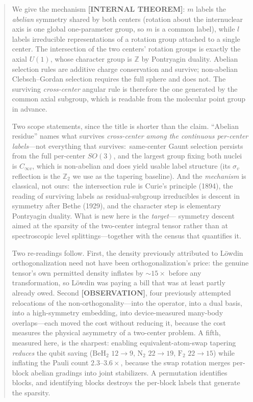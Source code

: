 \documentclass[aps,pra,twocolumn,superscriptaddress,longbibliography]{revtex4-2}
\begin{document}
\begin{abstract}
We give the mechanism \textbf{[INTERNAL THEOREM]}: $m$ labels the
\emph{abelian} symmetry shared by both centers (rotation about the
internuclear axis is one global one-parameter group, so $m$ is a common
label), while $l$ labels irreducible representations of a rotation group
attached to a single center.  The intersection of the two centers'
rotation groups is exactly the axial $U(1)$, whose character group is
$\mathbb{Z}$ by Pontryagin duality.  Abelian selection rules are additive
charge conservation and survive; non-abelian Clebsch--Gordan selection
requires the full sphere and does not.  The surviving \emph{cross-center}
angular rule is therefore the one generated by the common axial subgroup,
which is readable from the molecular point group in advance.

Two scope statements, since the title is shorter than the claim.
``Abelian residue'' names what survives \emph{cross-center among the
continuous per-center labels}---not everything that survives:\ same-center
Gaunt selection persists from the full per-center $SO(3)$, and the largest
group fixing both nuclei is $C_{\infty v}$, which is non-abelian and does
yield usable label structure (its $\sigma_v$ reflection is the
$\mathbb{Z}_2$ we use as the tapering baseline).  And the \emph{mechanism}
is classical, not ours:\ the intersection rule is Curie's principle (1894),
the reading of surviving labels as residual-subgroup irreducibles is
descent in symmetry after Bethe (1929), and the character step is
elementary Pontryagin duality.  What is new here is the \emph{target}---
symmetry descent aimed at the sparsity of the two-center integral tensor
rather than at spectroscopic level splittings---together with the census
that quantifies it.

Two re-readings follow.  First, the density previously attributed to
L\"owdin orthogonalization need not have been orthogonalization's price: the
genuine tensor's own permitted density inflates by $\sim 15\times$ before any
transformation, so L\"owdin was paying a bill that was at least partly already owed.  Second \textbf{[OBSERVATION]}, four previously attempted
relocations of the non-orthogonality---into the operator, into a dual
basis, into a high-symmetry embedding, into device-measured many-body
overlaps---each moved the cost without reducing it, because the cost
measures the physical asymmetry of a two-center problem.  A fifth,
measured here, is the sharpest: enabling equivalent-atom-swap tapering
\emph{reduces} the qubit saving ($\mathrm{BeH_2}$ $12 \to 9$,
$\mathrm{N_2}$ $22 \to 19$, $\mathrm{F_2}$ $22 \to 15$) while inflating
the Pauli count $2.3$--$3.6\times$, because the swap rotation merges
per-block abelian gradings into joint stabilizers.  A permutation
identifies blocks, and identifying blocks destroys the per-block labels
that generate the sparsity.


\end{abstract}
\end{document}
